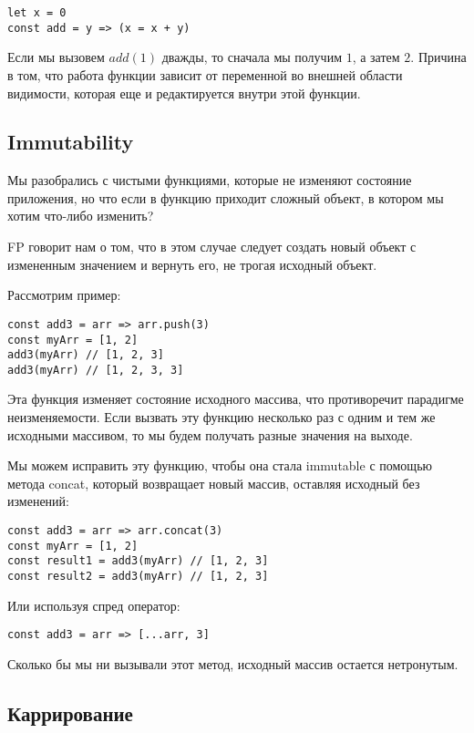 \begin{lstlisting}
let x = 0
const add = y => (x = x + y)
\end{lstlisting}

Если мы вызовем $add(1)$ дважды, то сначала мы получим $1$, а затем $2$. Причина в том, что работа функции зависит от переменной во внешней области видимости, которая еще и редактируется внутри этой функции.

\subsection{Immutability}

Мы разобрались с чистыми функциями, которые не изменяют состояние приложения, но что если в функцию приходит сложный объект, в котором мы хотим что-либо изменить? 

FP говорит нам о том, что в этом случае следует создать новый объект с измененным значением и вернуть его, не трогая исходный объект.

Рассмотрим пример:

\begin{lstlisting}
const add3 = arr => arr.push(3)
const myArr = [1, 2]
add3(myArr) // [1, 2, 3]
add3(myArr) // [1, 2, 3, 3]
\end{lstlisting}

Эта функция изменяет состояние исходного массива, что противоречит парадигме неизменяемости. Если вызвать эту функцию несколько раз с одним и тем же исходными массивом, то мы будем получать разные значения на выходе.

Мы можем исправить эту функцию, чтобы она стала immutable с помощью метода concat, который возвращает новый массив, оставляя исходный без изменений:

\begin{lstlisting}
const add3 = arr => arr.concat(3)
const myArr = [1, 2]
const result1 = add3(myArr) // [1, 2, 3]
const result2 = add3(myArr) // [1, 2, 3]
\end{lstlisting}

Или используя спред оператор:

\begin{lstlisting}
const add3 = arr => [...arr, 3]
\end{lstlisting}

Сколько бы мы ни вызывали этот метод, исходный массив остается нетронутым. 

\subsection{Каррирование}

